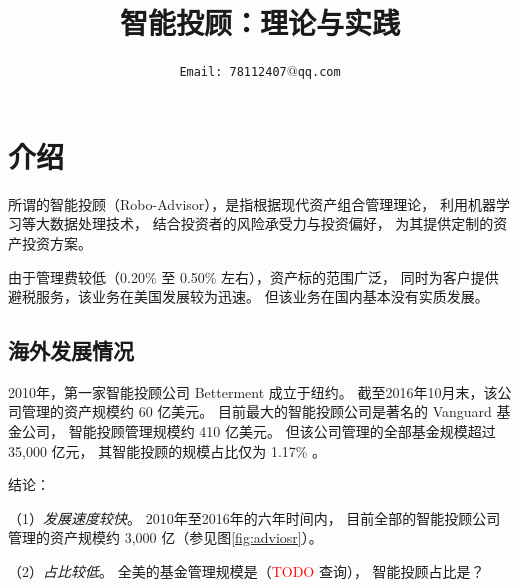 \documentclass[a4paper, 11pt, UTF8]{report}
\begin{document}
\title{智能投顾：理论与实践}
\author{ 
        \tt{Email: 78112407$@$qq.com}\\
        \vspace{0.5\textheight} \phantom{phan}}
\maketitle
\newpage
\pagestyle{empty}
\tableofcontents
\newpage

\pagestyle{plain}

\chapter{介绍}


所谓的智能投顾（Robo-Advisor），是指根据现代资产组合管理理论，
利用机器学习等大数据处理技术，
结合投资者的风险承受力与投资偏好，
为其提供定制的资产投资方案。

由于管理费较低（0.20\% 至 0.50\% 左右），资产标的范围广泛，
同时为客户提供避税服务，该业务在美国发展较为迅速。
但该业务在国内基本没有实质发展。



\section{海外发展情况}

2010年，第一家智能投顾公司 Betterment 成立于纽约。
截至2016年10月末，该公司管理的资产规模约 60 亿美元。
目前最大的智能投顾公司是著名的 Vanguard 基金公司，
智能投顾管理规模约 410 亿美元。
但该公司管理的全部基金规模超过 35,000 亿元，
其智能投顾的规模占比仅为 1.17\% 。

结论：

（1）\emph{发展速度较快}。
2010年至2016年的六年时间内，
目前全部的智能投顾公司管理的资产规模约 3,000 亿（参见图\ref{fig:adviosr}）。

（2）\emph{占比较低}。
全美的基金管理规模是（\textcolor{red}{TODO} 查询），
智能投顾占比是？
\end{document}
